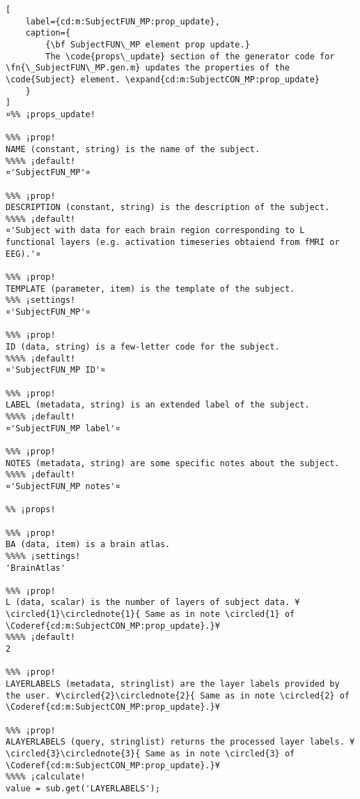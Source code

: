 \documentclass{tufte-handout}
\begin{document}
\begin{lstlisting}[
	label={cd:m:SubjectFUN_MP:prop_update},
	caption={
		{\bf SubjectFUN\_MP element prop update.}
		The \code{props\_update} section of the generator code for \fn{\_SubjectFUN\_MP.gen.m} updates the properties of the \code{Subject} element. \expand{cd:m:SubjectCON_MP:prop_update}
	}
]
¤%% ¡props_update!

%%% ¡prop!
NAME (constant, string) is the name of the subject.
%%%% ¡default!
¤'SubjectFUN_MP'¤

%%% ¡prop!
DESCRIPTION (constant, string) is the description of the subject.
%%%% ¡default!
¤'Subject with data for each brain region corresponding to L functional layers (e.g. activation timeseries obtaiend from fMRI or EEG).'¤

%%% ¡prop!
TEMPLATE (parameter, item) is the template of the subject.
%%% ¡settings!
¤'SubjectFUN_MP'¤

%%% ¡prop!
ID (data, string) is a few-letter code for the subject.
%%%% ¡default!
¤'SubjectFUN_MP ID'¤

%%% ¡prop!
LABEL (metadata, string) is an extended label of the subject.
%%%% ¡default!
¤'SubjectFUN_MP label'¤

%%% ¡prop!
NOTES (metadata, string) are some specific notes about the subject.
%%%% ¡default!
¤'SubjectFUN_MP notes'¤

%% ¡props!

%%% ¡prop!
BA (data, item) is a brain atlas.
%%%% ¡settings!
'BrainAtlas'

%%% ¡prop!
L (data, scalar) is the number of layers of subject data. ¥\circled{1}\circlednote{1}{ Same as in note \circled{1} of \Coderef{cd:m:SubjectCON_MP:prop_update}.}¥
%%%% ¡default!
2

%%% ¡prop!
LAYERLABELS (metadata, stringlist) are the layer labels provided by the user. ¥\circled{2}\circlednote{2}{ Same as in note \circled{2} of \Coderef{cd:m:SubjectCON_MP:prop_update}.}¥

%%% ¡prop!
ALAYERLABELS (query, stringlist) returns the processed layer labels. ¥\circled{3}\circlednote{3}{ Same as in note \circled{3} of \Coderef{cd:m:SubjectCON_MP:prop_update}.}¥
%%%% ¡calculate!
value = sub.get('LAYERLABELS');


\end{lstlisting}
\end{document}
